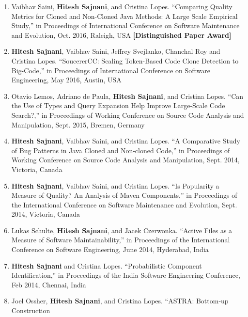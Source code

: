 \documentclass[letterpaper,11pt]{article}
\begin{document}
\begin{enumerate}
 \vspace{-1pt}\item\small{Vaibhav Saini, \textbf{Hitesh Sajnani}, and Cristina Lopes. “Comparing Quality Metrics for
Cloned and Non-Cloned Java Methods: A Large Scale Empirical Study,” in Proceedings
of International Conference on Software Maintenance and Evolution, Oct. 2016,
Raleigh, USA \textbf{[Distinguished Paper Award]}}
   \vspace{-1pt}\item\small{\textbf{Hitesh Sajnani}, Vaibhav Saini, Jeffrey Svejlanko, Chanchal Roy and Cristina Lopes.
“SoucererCC: Scaling Token-Based Code Clone Detection to Big-Code,” in Proceedings
of International Conference on Software Engineering, May 2016, Austin, USA  }
   \vspace{-1pt}\item\small{Otavio Lemos, Adriano de Paula, \textbf{Hitesh Sajnani}, and Cristina Lopes. “Can the Use of Types
and Query Expansion Help Improve Large-Scale Code Search?,” in Proceedings of
Working Conference on Source Code Analysis and Manipulation, Sept. 2015, Bremen,
Germany  }
   \vspace{-1pt}\item\small{\textbf{Hitesh Sajnani}, Vaibhav Saini, and Cristina Lopes. “A Comparative Study of Bug
Patterns in Java Cloned and Non-cloned Code,” in Proceedings of Working Conference
on Source Code Analysis and Manipulation, Sept. 2014, Victoria, Canada }
   \vspace{-1pt}\item\small{\textbf{Hitesh Sajnani}, Vaibhav Saini, and Cristina Lopes. “Is Popularity a Measure of Quality?
An Analysis of Maven Components,” in Proceedings of the International Conference on
Software Maintenance and Evolution, Sept. 2014, Victoria, Canada }
   \vspace{-1pt}\item\small{Lukas Schulte, \textbf{Hitesh Sajnani}, and Jacek Czerwonka. “Active Files as a Measure of
Software Maintainability,” in Proceedings of the International Conference on Software
Engineering, June 2014, Hyderabad, India }
   \vspace{-1pt}\item\small{\textbf{Hitesh Sajnani} and Cristina Lopes. “Probabilistic Component Identification,” in Proceedings
of the India Software Engineering Conference, Feb 2014, Chennai, India }
   \vspace{-1pt}\item\small{Joel Ossher, \textbf{Hitesh Sajnani}, and Cristina Lopes. “ASTRA: Bottom-up Construction
}
\end{enumerate}
\end{document}
